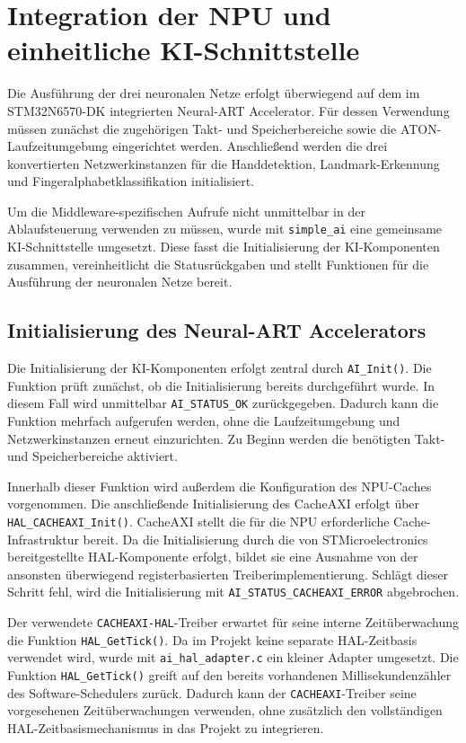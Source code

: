 \section{Integration der NPU und einheitliche KI-Schnittstelle}\label{sec:npu-integration}

Die Ausführung der drei neuronalen Netze erfolgt überwiegend auf dem im STM32N6570-DK integrierten Neural-ART Accelerator. Für dessen Verwendung müssen zunächst die zugehörigen Takt- und Speicherbereiche sowie die ATON-Laufzeitumgebung eingerichtet werden. Anschließend werden die drei konvertierten Netzwerkinstanzen für die Handdetektion, Landmark-Erkennung und Fingeralphabetklassifikation initialisiert.

Um die Middleware-spezifischen Aufrufe nicht unmittelbar in der Ablaufsteuerung verwenden zu müssen, wurde mit \texttt{simple\_ai} eine gemeinsame KI-Schnittstelle umgesetzt. Diese fasst die Initialisierung der KI-Komponenten zusammen, vereinheitlicht die Statusrückgaben und stellt Funktionen für die Ausführung der neuronalen Netze bereit.

\subsection{Initialisierung des Neural-ART Accelerators}\label{sub:npu-init}

Die Initialisierung der KI-Komponenten erfolgt zentral durch \texttt{AI\_Init()}. Die Funktion prüft zunächst, ob die Initialisierung bereits durchgeführt wurde. In diesem Fall wird unmittelbar \texttt{AI\_\allowbreak STATUS\_OK} zurückgegeben. Dadurch kann die Funktion mehrfach aufgerufen werden, ohne die Laufzeitumgebung und Netzwerkinstanzen erneut einzurichten. Zu Beginn werden die benötigten Takt- und Speicherbereiche aktiviert.

Innerhalb dieser Funktion wird außerdem die Konfiguration des NPU-Caches vorgenommen. Die anschließende Initialisierung des CacheAXI erfolgt über \texttt{HAL\_CACHEAXI\_Init()}. CacheAXI stellt die für die NPU erforderliche Cache-Infrastruktur bereit. Da die Initialisierung durch die von STMicroelectronics bereitgestellte HAL-Komponente erfolgt, bildet sie eine Ausnahme von der ansonsten überwiegend registerbasierten Treiberimplementierung. Schlägt dieser Schritt fehl, wird die Initialisierung mit \texttt{AI\_STATUS\_CACHEAXI\_ERROR} abgebrochen.  

Der verwendete \texttt{CACHEAXI-HAL}-Treiber erwartet für seine interne Zeitüberwachung die Funktion  \texttt{HAL\_GetTick()}. Da im Projekt keine separate HAL-Zeitbasis verwendet wird, wurde mit \texttt{ai\_hal\_adapter.c} ein kleiner Adapter umgesetzt. Die Funktion \texttt{HAL\_GetTick()} greift auf den bereits vorhandenen Millisekundenzähler des Software-Schedulers zurück. Dadurch kann der \texttt{CACHE\allowbreak AXI}-Treiber seine vorgesehenen Zeitüberwachungen verwenden, ohne zusätzlich den vollständigen HAL-Zeitbasismechanismus in das Projekt zu integrieren. 

